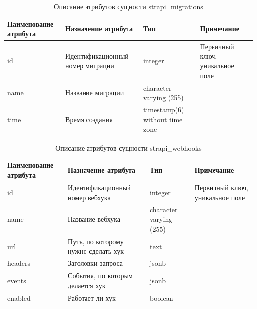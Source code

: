 \documentclass{mirea}
\begin{document}
	\begin{longtable}{ |p{}|p{}|p{}|p{}| } 
		\caption{Описание атрибутов сущности strapi\_migrations}
		\endfirsthead
		\endhead
		\hline
		Наименование атрибута & Назначение атрибута & Тип & Примечание \\ \hline
		
		id & Идентификацион\-ный номер миграции & integer & Первичный ключ, уникальное поле \\ \hline
		
		name & Название миграции & character varying (255) & \\ \hline
		
		time & Время создания  & timestamp(6) without time zone & \\ \hline
		
	\end{longtable}

	\begin{longtable}{ |p{}|p{}|p{}|p{}| } 
		\caption{Описание атрибутов сущности strapi\_webhooks}
		\endfirsthead
		\endhead
		\hline
		Наименование атрибута & Назначение атрибута & Тип & Примечание \\ \hline
		
		id & Идентификацион\-ный номер вебхука & integer & Первичный ключ, уникальное поле \\ \hline
		
		name & Название вебхука & character varying (255) & \\ \hline
		
		url & Путь, по которому нужно сделать хук  & text & \\ \hline
		
		headers & Заголовки запроса &jsonb & \\ \hline
		
		events & События, по которым делается хук & jsonb & \\ \hline
		
		enabled & Работает ли хук & boolean & \\ \hline
		
	\end{longtable}
\end{document}
